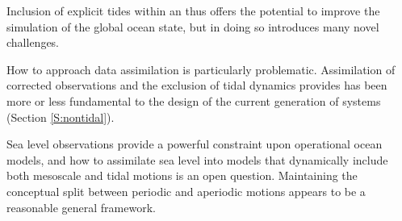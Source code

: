 Inclusion of explicit tides within an \OGCM{} thus offers the potential to improve the simulation of the global ocean state, but in doing so introduces many novel challenges.

How to approach data assimilation is particularly problematic.  Assimilation of corrected observations and the exclusion of tidal dynamics provides has been more or less fundamental to the design of the current generation of \GODAE{} systems (Section \ref{S:nontidal}).


Sea level observations provide a powerful constraint upon operational ocean models, and how to assimilate sea level into models that dynamically include both mesoscale and tidal motions is an open question.   Maintaining the conceptual split between periodic and aperiodic motions appears to be a reasonable general framework.
